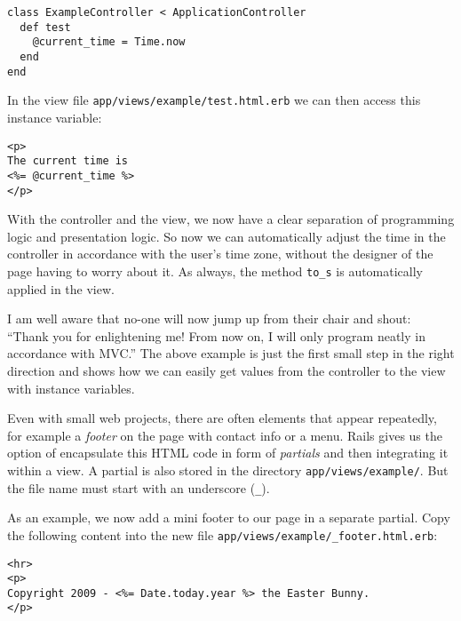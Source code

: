 \documentclass[a4paper]{book}
\begin{document}
\begin{shaded}\begin{verbatim}
class ExampleController < ApplicationController
  def test
    @current_time = Time.now
  end
end
\end{verbatim}\end{shaded}

In the view file \texttt{app/views/example/test.html.erb} we can then access this instance variable:

\begin{shaded}\begin{verbatim}
<p>
The current time is
<%= @current_time %>
</p>
\end{verbatim}\end{shaded}

With the controller and the view, we now have a clear separation of programming logic and presentation logic. So now we can automatically adjust the time in the controller in accordance with the user's time zone, without the designer of the page having to worry about it. As always, the method \texttt{to\_s} is automatically applied in the view.

I am well aware that no-one will now jump up from their chair and shout: “Thank you for enlightening me! From now on, I will only program neatly in accordance with MVC.” The above example is just the first small step in the right direction and shows how we can easily get values from the controller to the view with instance variables.


Even with small web projects, there are often elements that appear repeatedly, for example a \emph{footer} on the page with contact info or a menu. Rails gives us the option of encapsulate this HTML code in form of \emph{partials} and then integrating it within a view. A partial is also stored in the directory \texttt{app/views/example/}. But the file name must start with an underscore (\texttt{\_}).

As an example, we now add a mini footer to our page in a separate partial. Copy the following content into the new file \texttt{app/views/example/\_footer.html.erb}:

\begin{shaded}\begin{verbatim}
<hr>
<p>
Copyright 2009 - <%= Date.today.year %> the Easter Bunny.
</p>
\end{verbatim}\end{shaded}
\end{document}
